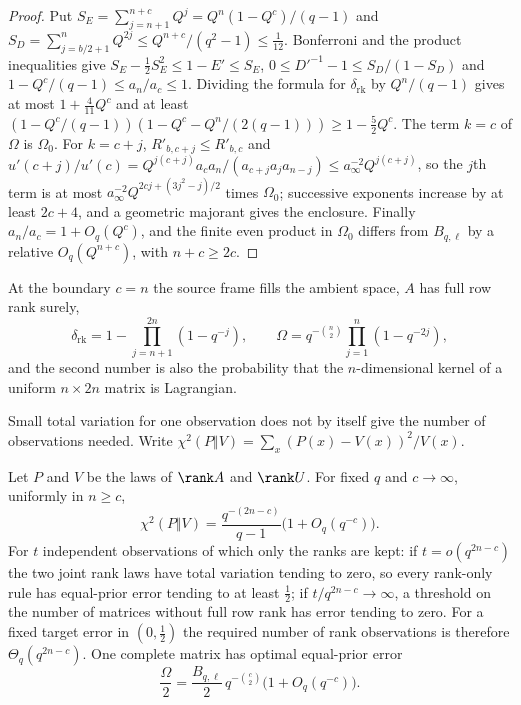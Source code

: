 \begin{proof}
Put $S_E=\sum_{j=n+1}^{n+c}Q^j=Q^n(1-Q^c)/(q-1)$ and $S_D=\sum_{j=b/2+1}^{n}Q^{2j}\le Q^{n+c}/(q^2-1)\le\tfrac1{12}$.
Bonferroni and the product inequalities give $S_E-\tfrac12S_E^2\le1-E'\le S_E$,
$0\le D'^{-1}-1\le S_D/(1-S_D)$ and $1-Q^c/(q-1)\le a_n/a_c\le1$. Dividing the formula for
$\delta_{\mathrm{rk}}$ by $Q^n/(q-1)$ gives at most $1+\tfrac4{11}Q^c$ and at least
$(1-Q^c/(q-1))(1-Q^c-Q^n/(2(q-1)))\ge1-\tfrac52Q^c$. The term $k=c$ of $\Omega$ is $\Omega_0$. For
$k=c+j$, $R'_{b,c+j}\le R'_{b,c}$ and
$u'(c+j)/u'(c)=Q^{j(c+j)}a_ca_n/(a_{c+j}a_ja_{n-j})\le a_\infty^{-2}Q^{j(c+j)}$, so the $j$th term
is at most $a_\infty^{-2}Q^{2cj+(3j^2-j)/2}$ times $\Omega_0$; successive exponents increase by at
least $2c+4$, and a geometric majorant gives the enclosure. Finally $a_n/a_c=1+O_q(Q^c)$, and the
finite even product in $\Omega_0$ differs from $B_{q,\ell}$ by a relative $O_q(Q^{n+c})$, with
$n+c\ge2c$.
\end{proof}

At the boundary $c=n$ the source frame fills the ambient space, $A$ has full row rank surely,
\[
 \delta_{\mathrm{rk}}=1-\prod_{j=n+1}^{2n}(1-q^{-j}),\qquad\Omega=q^{-\binom n2}\prod_{j=1}^n(1-q^{-2j}),
\]
and the second number is also the probability that the $n$-dimensional kernel of a uniform $n\times2n$
matrix is Lagrangian.

Small total variation for one observation does not by itself give the number of observations needed.
Write $\chi^2(P\Vert V)=\sum_x(P(x)-V(x))^2/V(x)$.

\begin{theorem}\label{spn:thm:wide-sample}
Let $P$ and $V$ be the laws of $\rank A$ and $\rank U$. For fixed $q$ and $c\to\infty$, uniformly in
$n\ge c$,
\[
 \chi^2(P\Vert V)=\frac{q^{-(2n-c)}}{q-1}\bigl(1+O_q(q^{-c})\bigr).
\]
For $t$ independent observations of which only the ranks are kept: if $t=o(q^{2n-c})$ the two joint
rank laws have total variation tending to zero, so every rank-only rule has equal-prior error
tending to at least $\tfrac12$; if $t/q^{2n-c}\to\infty$, a threshold on the number of matrices
without full row rank has error tending to zero. For a fixed target error in $(0,\tfrac12)$ the
required number of rank observations is therefore $\Theta_q(q^{2n-c})$. One complete matrix has
optimal equal-prior error
\[
 \frac\Omega2=\frac{B_{q,\ell}}2\,q^{-\binom c2}\bigl(1+O_q(q^{-c})\bigr).
\]
\end{theorem}

